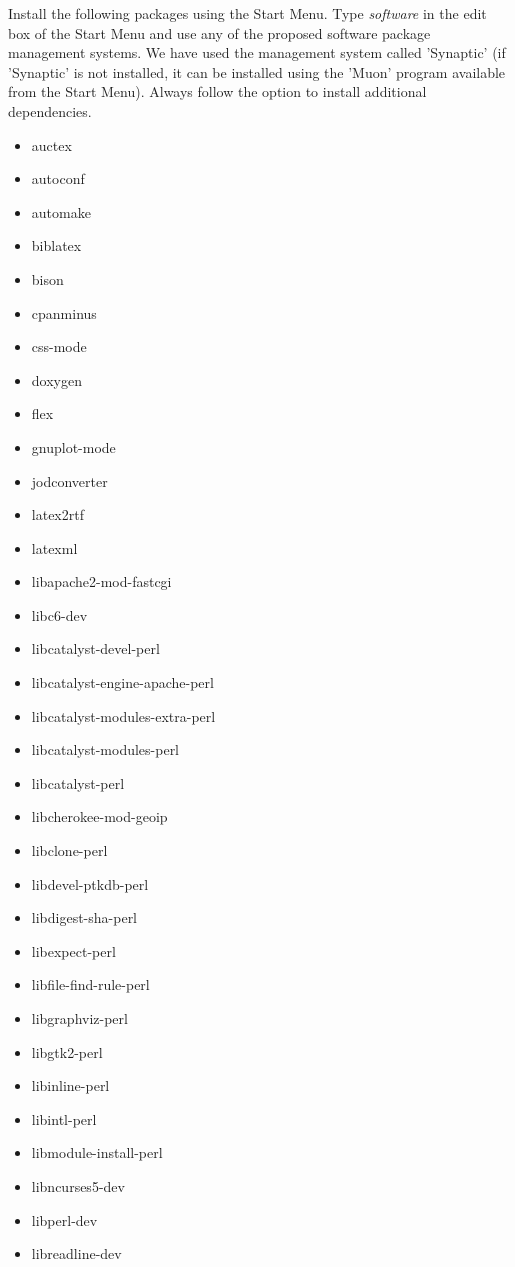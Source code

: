 \documentclass[12pt]{article}
\begin{document}
Install the following packages using the Start Menu.  Type
  {\it software} in the edit box of the Start Menu and use any of the
  proposed software package management systems.  We have used the
  management system called 'Synaptic' (if 'Synaptic' is not installed,
  it can be installed using the 'Muon' program available from the
  Start Menu).  Always follow the option to install additional
  dependencies.
  \begin{itemize}
  \item auctex
  \item autoconf
  \item automake
  \item biblatex
  \item bison
  \item cpanminus
  \item css-mode
  \item doxygen
  \item flex
  \item gnuplot-mode
  \item jodconverter
  \item latex2rtf
  \item latexml
  \item libapache2-mod-fastcgi
  \item libc6-dev
  \item libcatalyst-devel-perl
  \item libcatalyst-engine-apache-perl
  \item libcatalyst-modules-extra-perl
  \item libcatalyst-modules-perl
  \item libcatalyst-perl
  \item libcherokee-mod-geoip
  \item libclone-perl
  \item libdevel-ptkdb-perl
  \item libdigest-sha-perl
  \item libexpect-perl
  \item libfile-find-rule-perl
  \item libgraphviz-perl
  \item libgtk2-perl
  \item libinline-perl
  \item libintl-perl
  \item libmodule-install-perl
  \item libncurses5-dev
  \item libperl-dev
  \item libreadline-dev

\end{itemize}
\end{document}
